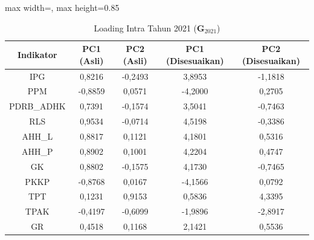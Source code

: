 \begin{table}[H]
\centering
\caption{Loading Intra Tahun 2021 ($\mathbf{G}_{2021}$)} \label{tab:app1loading_intra_2021}
\begin{adjustbox}{max width=\textwidth, max height=0.85\textheight}
\begin{tabular}{|c|c|c|c|c|}
\hline
\textbf{Indikator} & \textbf{PC1 (Asli)} & \textbf{PC2 (Asli)} & \textbf{PC1 (Disesuaikan)} & \textbf{PC2 (Disesuaikan)} \\
\hline
IPG & 0,8216 & -0,2493 & 3,8953 & -1,1818 \\
PPM & -0,8859 & 0,0571 & -4,2000 & 0,2705 \\
PDRB\_ADHK & 0,7391 & -0,1574 & 3,5041 & -0,7463 \\
RLS & 0,9534 & -0,0714 & 4,5198 & -0,3386 \\
AHH\_L & 0,8817 & 0,1121 & 4,1801 & 0,5316 \\
AHH\_P & 0,8902 & 0,1001 & 4,2204 & 0,4747 \\
GK & 0,8802 & -0,1575 & 4,1730 & -0,7465 \\
PKKP & -0,8768 & 0,0167 & -4,1566 & 0,0792 \\
TPT & 0,1231 & 0,9153 & 0,5836 & 4,3395 \\
TPAK & -0,4197 & -0,6099 & -1,9896 & -2,8917 \\
GR & 0,4518 & 0,1168 & 2,1421 & 0,5536 \\
\hline
\end{tabular}
\end{adjustbox}
\end{table}